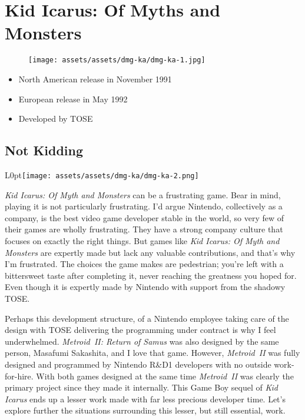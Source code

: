 \documentclass{book}
\begin{document}
\chapter*{Kid Icarus: Of Myths and Monsters}
\vspace{\baselineskip}\begin{figure}[H]{\texttt{[image: assets/assets/dmg-ka/dmg-ka-1.jpg]}}\end{figure}\vspace{\baselineskip}
\begin{itemize}[left=0pt, nosep]
\item North American release in November 1991
\item European release in May 1992
\item Developed by TOSE

\end{itemize}
\newpage\FloatBarrier\section*{Not Kidding}
\begin{wrapfigure}{L}{0pt}{\texttt{[image: assets/assets/dmg-ka/dmg-ka-2.png]}}\end{wrapfigure}\noindent
\emph{Kid Icarus: Of Myth and Monsters} can be a frustrating game. Bear in mind, playing it is not particularly frustrating. I’d argue Nintendo, collectively as a company, is the best video game developer stable in the world, so very few of their games are wholly frustrating. They have a strong company culture that focuses on exactly the right things. But games like \emph{Kid Icarus: Of Myth and Monsters} are expertly made but lack any valuable contributions, and that’s why I’m frustrated. The choices the game makes are pedestrian; you’re left with a bittersweet taste after completing it, never reaching the greatness you hoped for. Even though it is expertly made by Nintendo with support from the shadowy TOSE.\par
Perhaps this development structure, of a Nintendo employee taking care of the design with TOSE delivering the programming under contract is why I feel underwhelmed. \emph{Metroid~II: Return of Samus} was also designed by the same person, Masafumi Sakashita, and I love that game. However, \emph{Metroid~II} was fully designed and programmed by Nintendo R\&D1 developers with no outside work-for-hire. With both games designed at the same time \emph{Metroid~II} was clearly the primary project since they made it internally. This Game Boy sequel of \emph{Kid Icarus} ends up a lesser work made with far less precious developer time. Let’s explore further the situations surrounding this lesser, but still essential, work.\par
\end{document}
